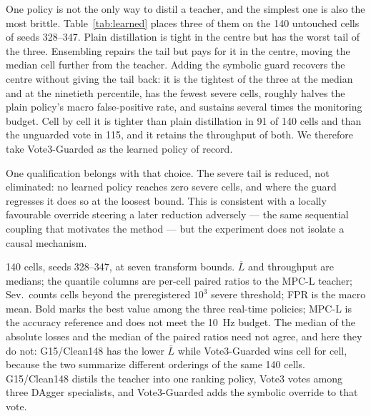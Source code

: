 \documentclass[letterpaper, 10 pt, conference]{ieeeconf}  %
\newcommand{\tablenote}[1]{%
  \par\vspace{3pt}%
  \begin{minipage}{\linewidth}\footnotesize\raggedright #1\end{minipage}%
}
\begin{document}
One policy is not the only way to distil a teacher, and the simplest one is also the most brittle.
Table~\ref{tab:learned} places three of them on the 140 untouched cells of seeds 328--347.
Plain distillation is tight in the centre but has the worst tail of the three.
Ensembling repairs the tail but pays for it in the centre, moving the median cell further from the teacher.
Adding the symbolic guard recovers the centre without giving the tail back: it is the tightest of the three at the median and at the ninetieth percentile, has the fewest severe cells, roughly halves the plain policy's macro false-positive rate, and sustains several times the monitoring budget.
Cell by cell it is tighter than plain distillation in 91 of 140 cells and than the unguarded vote in 115, and it retains the throughput of both.
We therefore take Vote3-Guarded as the learned policy of record.

One qualification belongs with that choice.
The severe tail is reduced, not eliminated: no learned policy reaches zero severe cells, and where the guard regresses it does so at the loosest bound.
This is consistent with a locally favourable override steering a later reduction adversely --- the same sequential coupling that motivates the method --- but the experiment does not isolate a causal mechanism.

\begin{table}[t]
  \centering
  \caption{Learned policies on the untouched confirmation cohort}
  \label{tab:learned}
  \footnotesize
  \setlength{\tabcolsep}{2.5pt}
  
  \tablenote{
    140 cells, seeds 328--347, at seven transform bounds. $\overline{L}$ and
        throughput are medians; the quantile columns are per-cell paired ratios
        to the MPC-L teacher; Sev.\ counts cells beyond the preregistered
        $10^3$ severe threshold; FPR is the macro mean. Bold marks the best
        value among the three real-time policies; MPC-L is the accuracy
        reference and does not meet the \SI{10}{\hertz} budget.
        The median of the absolute losses and the median of the paired ratios
        need not agree, and here they do not: G15/Clean148 has the lower
        $\overline{L}$ while Vote3-Guarded wins cell for cell, because the two
        summarize different orderings of the same 140 cells.
        G15/Clean148 distils the teacher into one ranking policy, Vote3 votes
        among three DAgger specialists, and Vote3-Guarded adds the symbolic
        override to that vote.
  }
\end{table}
\end{document}
